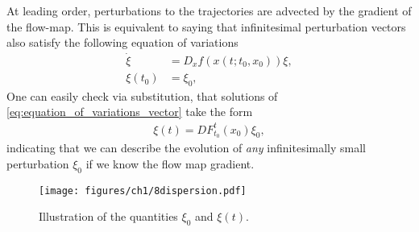 At leading order, perturbations to the trajectories are advected by the gradient of the flow-map. This is equivalent to saying that infinitesimal perturbation vectors also satisfy the following equation of variations 
\begin{align}
\label{eq:equation_of_variations_vector}
		 \dot{{\xi}}&= D_ {x} f( {x}(t; t_0,  {x}_0)) \xi, \\ 
		 \xi(t_0) &= \xi_0,
\end{align}
One can easily check via substitution, that solutions of \eqref{eq:equation_of_variations_vector} take the form 
\begin{align}
\label{eq:general_solution_eqvar}
\xi(t) = DF_{t_0}^{t}(x_0) \xi_0,
\end{align}
indicating that we can describe the evolution of {\em any} infinitesimally small perturbation $\xi_0$ if we know the flow map gradient. 
	\begin{figure}[h!]
		\centering
		\texttt{[image: figures/ch1/8dispersion.pdf]}
		\caption{Illustration of the quantities $\xi_0$ and $\xi(t)$.}
	\end{figure}
